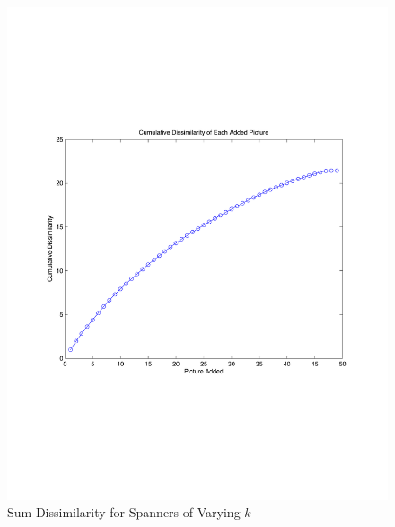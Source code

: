 \begin{figure} 
\begin{centering}
    \includegraphics[scale=0.35]{figures/spannerCumulativeDist.pdf}
    \caption{Sum Dissimilarity for Spanners of Varying $k$}
    \label{fig:spanSumDissim}
\end{centering}
\end{figure}


